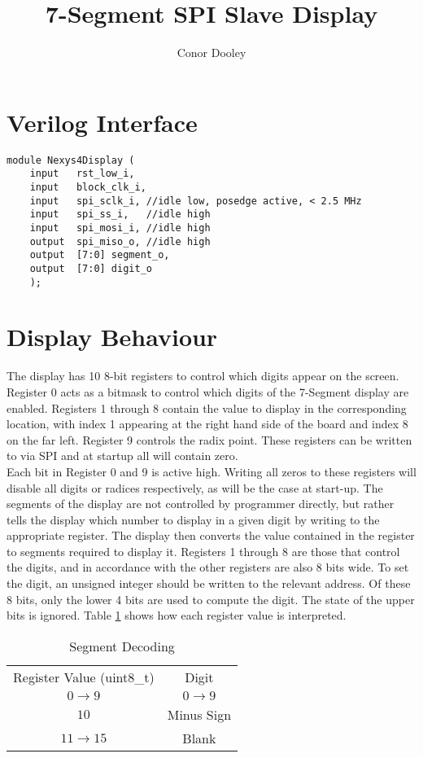 \documentclass[a4paper,12pt]{article}
\begin{document}
\title{7-Segment SPI Slave Display}
\author{Conor Dooley}
\maketitle

\section*{Verilog Interface}
\begin{lstlisting}[style={verilog-style}]
	module Nexys4Display (
    input   rst_low_i,
    input   block_clk_i,
    input   spi_sclk_i, //idle low, posedge active, < 2.5 MHz
    input   spi_ss_i,   //idle high
    input   spi_mosi_i, //idle high
    output  spi_miso_o, //idle high
    output  [7:0] segment_o, 
    output  [7:0] digit_o
    );
\end{lstlisting}

\section*{Display Behaviour}
The display has 10 8-bit registers to control which digits appear on the screen. Register 0 acts as a bitmask to control which digits of the 7-Segment display are enabled. Registers 1 through 8 contain the value to display in the corresponding location, with index 1 appearing at the right hand side of the board and index 8 on the far left. Register 9 controls the radix point. These registers can be written to via SPI and at startup all will contain zero.\\
Each bit in Register 0 and 9 is active high. Writing all zeros to these registers will disable all digits or radices respectively, as will be the case at start-up.
The segments of the display are not controlled by programmer directly, but rather tells the display which number to display in a given digit by writing to the appropriate register. The display then converts the value contained in the register to segments required to display it. Registers 1 through 8 are those that control the digits, and in accordance with the other registers are also 8 bits wide. To set the digit, an unsigned integer should be written to the relevant address. Of these 8 bits, only the lower 4 bits are used to compute the digit. The state of the upper bits is ignored. Table \ref{table:decode} shows how each register value is interpreted.
\begin{table}[!h]
	\begin{center} 
		\begin{tabular}{c|c}
			Register Value (uint8\_t) & Digit \\
			$0\rightarrow 9$ & $0\rightarrow 9$ \\	
			$10$ & Minus Sign \\	
			$11\rightarrow 15$ & Blank \\			
		\end{tabular}
	\end{center}
	\caption{Segment Decoding}
	\label{table:decode}
\end{table}
\end{document}
